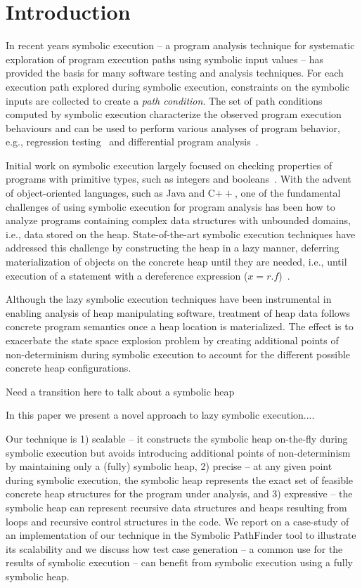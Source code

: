 \section{Introduction}

In recent years symbolic execution --
a program analysis technique for systematic exploration of
program execution paths using symbolic input values -- has provided
the basis for many software testing and analysis techniques.
For each execution path explored during symbolic execution, constraints
on the symbolic inputs are collected to create a \emph{path
condition}. The set of path conditions computed by symbolic execution
characterize the observed program execution behaviours and can
be used to perform various analyses of program behavior, e.g.,
regression testing~\cite{} and differential program 
analysis~\cite{}. 

Initial work on symbolic execution largely focused on checking 
properties of programs with primitive types, such as integers and 
booleans~\cite{clarke76TSE,King:76}. With the advent of object-oriented
languages, such as Java and C$++$, one of the fundamental challenges 
of using symbolic execution for program analysis
has been how to analyze programs containing
complex data structures with unbounded domains, i.e., data stored
on the heap. State-of-the-art symbolic execution techniques have 
addressed this challenge by constructing the heap in a lazy manner, 
deferring materialization of objects on the concrete heap until
they are needed, i.e., until execution of a statement with a 
dereference expression ($x = r.f$)~\cite{Kiasan06,Kiasan07,GSE03}. 

Although the lazy symbolic execution techniques have been instrumental 
in enabling analysis of heap manipulating software, treatment of
heap data follows concrete program semantics once a heap location is
materialized. The effect is to exacerbate 
the state space explosion problem by creating additional points of 
non-determinism during symbolic execution to account for the 
different possible concrete heap configurations.

Need a transition here to talk about a symbolic heap

In this paper we present a novel approach to lazy symbolic
execution....

Our technique is 1) scalable -- it constructs the symbolic
heap on-the-fly during symbolic execution but avoids introducing 
additional points of non-determinism
by maintaining only a (fully) symbolic heap,
2) precise -- at any given point during symbolic execution, 
the symbolic heap represents the exact set of feasible
concrete heap structures for the program under analysis, and
3) expressive -- the symbolic heap can represent recursive data structures 
and heaps resulting from loops and recursive control structures in the code. 
We report on a case-study of an implementation of our technique in the
Symbolic PathFinder tool to illustrate
 its scalability and we discuss how test case generation -- a common
 use for the results of symbolic execution -- can benefit from symbolic
 execution using a fully symbolic heap.

